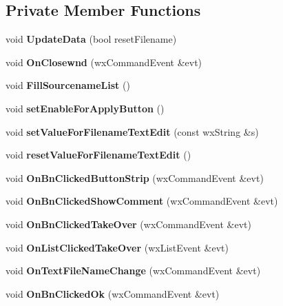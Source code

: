 \subsection*{Private Member Functions}
\begin{DoxyCompactItemize}
\item 
void {\bfseries UpdateData} (bool resetFilename)\label{classCFileDetailDialog_a9bfb728f74a9b7fb38046f847c7bc3a8}

\item 
void {\bfseries OnClosewnd} (wxCommandEvent \&evt)\label{classCFileDetailDialog_a56f7c7ef0965c70d214729bc48dc84d9}

\item 
void {\bfseries FillSourcenameList} ()\label{classCFileDetailDialog_ad5195e1154bee821c77415ed93500b77}

\item 
void {\bfseries setEnableForApplyButton} ()\label{classCFileDetailDialog_a0a091e9e058e338ed5d310eaaae2d648}

\item 
void {\bfseries setValueForFilenameTextEdit} (const wxString \&s)\label{classCFileDetailDialog_a2b8c808bcf057768bd0ee8af634a2490}

\item 
void {\bfseries resetValueForFilenameTextEdit} ()\label{classCFileDetailDialog_afcd5b99efb0722bc0f9cb303b27a0520}

\item 
void {\bfseries OnBnClickedButtonStrip} (wxCommandEvent \&evt)\label{classCFileDetailDialog_a51aaf0edba6921da603086ee6c034363}

\item 
void {\bfseries OnBnClickedShowComment} (wxCommandEvent \&evt)\label{classCFileDetailDialog_a4a7791f49ae32bd0f221b7a7ba24586b}

\item 
void {\bfseries OnBnClickedTakeOver} (wxCommandEvent \&evt)\label{classCFileDetailDialog_a1bbf8193ec76ef2b46c91dbe2cf5f694}

\item 
void {\bfseries OnListClickedTakeOver} (wxListEvent \&evt)\label{classCFileDetailDialog_a6151d1bcdda58d928017dfc2c00a0af6}

\item 
void {\bfseries OnTextFileNameChange} (wxCommandEvent \&evt)\label{classCFileDetailDialog_a31b68ac3155d14045afc684b005b3e8c}

\item 
void {\bfseries OnBnClickedOk} (wxCommandEvent \&evt)\label{classCFileDetailDialog_ac89e2762319026901df0e7d2c8f16bdf}


\end{DoxyCompactItemize}

